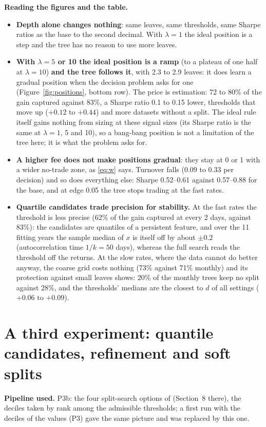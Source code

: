 \documentclass[11pt,a4paper]{article}
\newcommand{\code}[1]{\texttt{\detokenize{#1}}}
\newcommand{\1}{\mathbf{1}}
\begin{document}
\textbf{Reading the figures and the table.}
\begin{itemize}\setlength{\itemsep}{1pt}
\item \textbf{Depth alone changes nothing}: same leaves, same thresholds, same Sharpe ratios as the base to the second decimal. With $\lambda=1$ the ideal position is a step and the tree has no reason to use more leaves.
\item \textbf{With $\lambda=5$ or 10 the ideal position is a ramp} (to a plateau of one half at $\lambda=10$) \textbf{and the tree follows it}, with 2.3 to 2.9 leaves: it does learn a gradual position when the decision problem asks for one (Figure~\ref{fig:positions}, bottom row). The price is estimation: 72 to 80\% of the gain captured against 83\%, a Sharpe ratio 0.1 to 0.15 lower, thresholds that move up ($+0.12$ to $+0.44$) and more datasets without a split. The ideal rule itself gains nothing from sizing at these signal sizes (its Sharpe ratio is the same at $\lambda=1$, 5 and 10), so a bang-bang position is not a limitation of the tree here; it is what the problem asks for.
\item \textbf{A higher fee does not make positions gradual}: they stay at 0 or 1 with a wider no-trade zone, as \eqref{eq:w} says. Turnover falls (0.09 to 0.33 per decision) and so does everything else: Sharpe 0.52--0.61 against 0.57--0.88 for the base, and at edge 0.05 the tree stops trading at the fast rates.
\item \textbf{Quartile candidates trade precision for stability.} At the fast rates the threshold is less precise (62\% of the gain captured at every 2 days, against 83\%): the candidates are quantiles of a persistent feature, and over the 11 fitting years the sample median of $x$ is itself off by about $\pm0.2$ (autocorrelation time $1/k=50$ days), whereas the full search reads the threshold off the returns. At the slow rates, where the data cannot do better anyway, the coarse grid costs nothing (73\% against 71\% monthly) and its protection against small leaves shows: 20\% of the monthly trees keep no split against 28\%, and the thresholds' medians are the closest to $d$ of all settings ($+0.06$ to $+0.09$).
\end{itemize}


\section{A third experiment: quantile candidates, refinement and soft splits}\label{sec:enhancements}
\textbf{Pipeline used.} P3b: the four split-search options of \code{model_and_training_pipeline.tex} (Section~8 there), the deciles taken by rank among the admissible thresholds; a first run with the deciles of the values (P3) gave the same picture and was replaced by this one.
\end{document}
